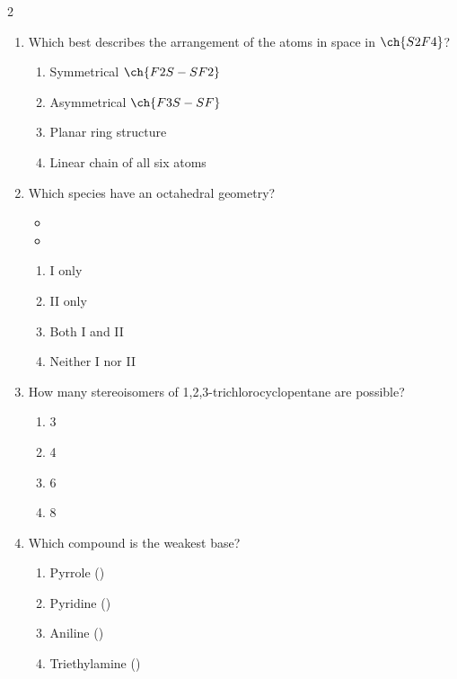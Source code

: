 \documentclass[10pt,letterpaper]{article}
\begin{document}
\begin{multicols*}{2}
\begin{enumerate}
    \item Which best describes the arrangement of the atoms in space in $\ch{S2F4}$?
    \begin{enumerate}[label=(\textsubscript{\Alph*})]
        \item Symmetrical $\ch{F2S-SF2}$
        \item Asymmetrical $\ch{F3S-SF}$
        \item Planar ring structure
        \item Linear chain of all six atoms
    \end{enumerate}

    \item Which species have an octahedral geometry?
    \begin{itemize}
        \item[I.] 
        \item[II.] 
    \end{itemize}
    \begin{enumerate}[label=(\textsubscript{\Alph*})]
        \item I only
        \item II only
        \item Both I and II
        \item Neither I nor II
    \end{enumerate}

    \item How many stereoisomers of 1,2,3-trichlorocyclopentane are possible?
    \begin{enumerate}[label=(\textsubscript{\Alph*})]
        \item 3
        \item 4
        \item 6
        \item 8
    \end{enumerate}

    \item Which compound is the weakest base?
    \begin{enumerate}[label=(\textsubscript{\Alph*})]
        \item Pyrrole ()
        \item Pyridine ()
        \item Aniline ()
        \item Triethylamine ()
    \end{enumerate}


\end{enumerate}
\end{multicols*}
\end{document}
